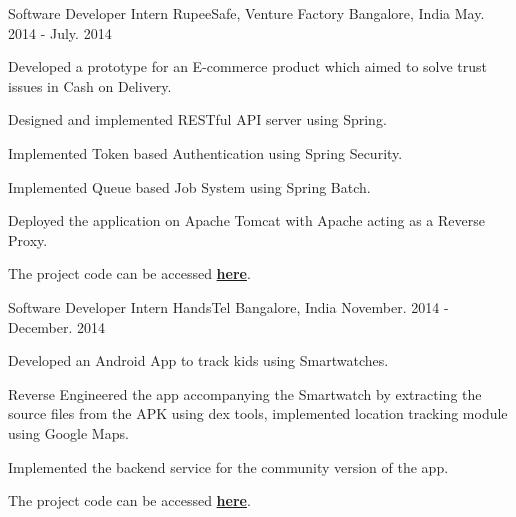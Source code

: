 \begin{cventries}
  \cventry
    {Software Developer Intern}
    {RupeeSafe, Venture Factory}
    {Bangalore, India}
    {May. 2014 - July. 2014}
    {
      \begin{cvitems}
        \item {Developed a prototype for an E-commerce product which aimed to solve trust issues in Cash on Delivery.}
        \item {Designed and implemented RESTful API server using Spring.}
        \item {Implemented Token based Authentication using Spring Security.}
        \item {Implemented Queue based Job System using Spring Batch.}
        \item {Deployed the application on Apache Tomcat with Apache acting as a Reverse Proxy.}
        \item {The project code can be accessed \href{https://github.com/varun93/vcod}{\textbf{here}}.}
       \end{cvitems}
    }

    \cventry
    {Software Developer Intern}
    {HandsTel}
    {Bangalore, India}
    {November. 2014 - December. 2014}
    {
      \begin{cvitems}
        \item {Developed an Android App to track kids using Smartwatches.}
        \item {Reverse Engineered the app accompanying the Smartwatch by extracting the source files from the APK using dex tools, implemented location tracking module using Google Maps.}
        \item {Implemented the backend service for the community version of the app.}
        \item {The project code can be accessed \href{https://github.com/varun93/handstel-android-app}{\textbf{here}}.}
      \end{cvitems}
    }

\end{cventries}